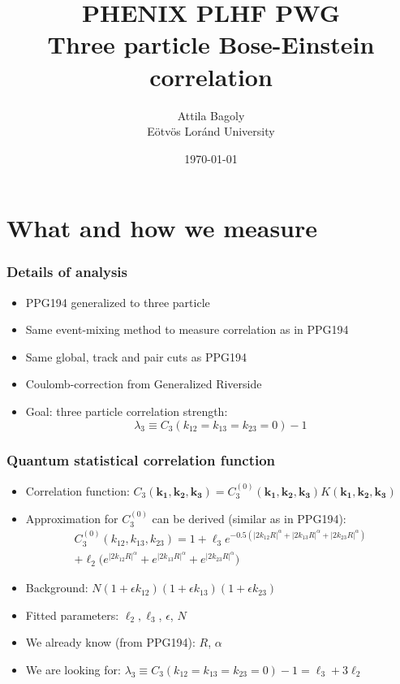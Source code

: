 \documentclass{beamer}
\title[Three particle Levy HBT]{\Large{PHENIX PLHF PWG}\\Three particle Bose-Einstein correlation}
\author[Attila Bagoly]{Attila Bagoly\\ Eötvös Loránd University \vspace{0.5cm}}
\date[\today]{\today}
\institute[ELTE]{
\large{Supervisor: Máté Csanád}
}
\begin{document}
\begin{frame}
  \titlepage
\end{frame}


\section{What and how we measure}
\begin{frame}
\frametitle{Details of analysis}
\begin{itemize}
\setlength{\itemsep}{22pt}
\item PPG194 generalized to three particle
\item Same event-mixing method to measure correlation as in PPG194
\item Same global, track and pair cuts as PPG194
\item Coulomb-correction from Generalized Riverside
\item Goal: three particle correlation strength:
\begin{equation*}
\lambda_3 \equiv  C_3(k_{12}=k_{13}=k_{23}=0)-1
\end{equation*}
\end{itemize}
\end{frame}



\begin{frame}
\frametitle{Quantum statistical correlation function}
\begin{itemize}
\setlength{\itemsep}{16pt}
\item Correlation function: $C_3(\bm{k_1}, \bm{k_2}, \bm{k_3}) = C_3^{(0)}(\bm{k_1}, \bm{k_2}, \bm{k_3})K(\bm{k_1}, \bm{k_2}, \bm{k_3})$
\item Approximation for $C_3^{(0)}$ can be derived (similar as in PPG194):
\begin{align}
C_3^{(0)}(k_{12}, k_{13}, k_{23}) = 1+ \ell_3e^{-0.5(|2k_{12}R|^\alpha+|2k_{13}R|^\alpha+|2k_{23}R|^\alpha)}\nonumber\\
+\ell_2\bigg(e^{|2k_{12}R|^\alpha}+e^{|2k_{13}R|^\alpha}+e^{|2k_{23}R|^\alpha}\bigg)
\end{align}
\item Background: $N(1+\epsilon k_{12})(1+\epsilon k_{13})(1+\epsilon k_{23})$
\item Fitted parameters: $\ell_2, \ell_3$, $\epsilon$, $N$
\item We already know (from PPG194): $R$, $\alpha$
\item We are looking for: $\lambda_3 \equiv  C_3(k_{12}=k_{13}=k_{23}=0)-1=\ell_3+3\ell_2$
\end{itemize}
\end{frame}
\end{document}
